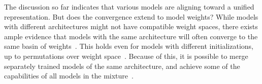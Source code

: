 \documentclass{article}
\newcommand{\bc}[1]{{\color{olive}BC: #1}}
\newcommand{\phil}[1]{{\color{orange}PI: #1}}
\theoremstyle{plain}
\theoremstyle{definition}
\theoremstyle{remark}
\begin{document}



The discussion so far indicates that various models are aligning toward a unified representation. But does the convergence extend to model weights? While models with different architectures might not have compatible weight spaces, there exists ample evidence that models with the same architecture will often converge to the same basin of weights~\cite{nagarajan2019uniform,garipov2018loss,lubana2023mechanistic}. This holds even for models with different initializations, up to permutations over weight space~\citep{ainsworth2022git}. Because of this, it is possible to merge separately trained models of the same architecture, and achieve some of the capabilities of all models in the mixture~\cite{stoica2023zipit,jordan2022repair,wortsman2022model}.
\end{document}

